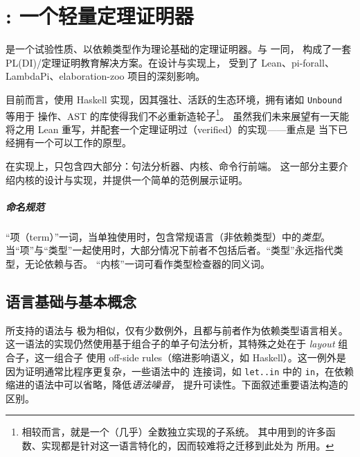 \chapter{\Tigrisd: 一个轻量定理证明器}
\renewottcommands[dd]

\Tigrisd 是一个试验性质、以依赖类型作为理论基础的定理证明器。\Tigris 与 \Tigrisd 一同，
构成了一套 PL(DI)/定理证明教育解决方案。\Tigrisd 在设计与实现上，
受到了 Lean、pi-forall、LambdaPi、elaboration-zoo 项目的深刻影响。

目前而言，\Tigrisd 使用 Haskell 实现，因其强壮、活跃的生态环境，拥有诸如 \texttt{Unbound} 等用于
操作\lambdacalc、AST 的库使得我们不必重新造轮子\footnote{
  相较而言，\Tigris 就是一个（几乎）全数独立实现的子系统。
  其中用到的许多函数、实现都是针对这一语言特化的，因而较难将之迁移到此处为 \Tigrisd 所用。
}。
虽然我们未来展望有一天能将之用 Lean 重写，并配套一个定理证明过（verified）的实现——重点是
当下已经拥有一个可以工作的原型。

在实现上，\Tigrisd 只包含四大部分：句法分析器、内核、命令行前端。
这一部分主要介绍内核的设计与实现，并提供一个简单的范例展示证明。

\paragraph{命名规范} “项（term）”一词，当单独使用时，包含常规语言（非依赖类型）中的\emph{类型}。
当“项”与“类型”一起使用时，大部分情况下前者不包括后者。“类型”永远指代类型，无论依赖与否。
“内核”一词可看作类型检查器的同义词。

\section{语言基础与基本概念}
\Tigrisd 所支持的语法与 \Tigris 极为相似，仅有少数例外，且都与前者作为依赖类型语言相关。
这一语法的实现仍然使用基于组合子的单子句法分析，其特殊之处在于 \emph{layout} 组合子，这一组合子
使用 off-side rules（缩进影响语义，如 Haskell）。这一例外是因为证明通常比程序更复杂，一些语法中的
连接词，如 \texttt{let..in} 中的 \texttt{in}，在依赖缩进的语法中可以省略，降低\emph{语法噪音}，
提升可读性。下面叙述重要语法构造的区别。

